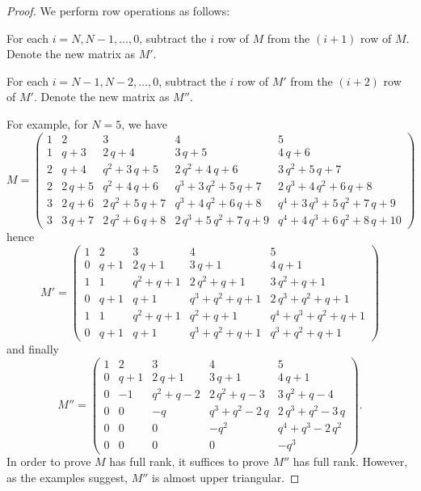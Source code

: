 \begin{proof}
  We perform row operations as follows:
  \begin{itemize}
    \ii For each $i=N,N-1,\dots,0$, subtract the $i$ row of $M$
    from the $(i+1)$ row of $M$.
    Denote the new matrix as $M'$.

    \ii For each $i=N-1,N-2,\dots,0$, subtract the $i$ row of $M'$
    from the $(i+2)$ row of $M'$.
    Denote the new matrix as $M''$.
  \end{itemize}
  For example, for $N = 5$, we have
  \[
    M =
    \begin{pmatrix}
    1 & 2 & 3 & 4 & 5 \\
    1 & q + 3 & 2 \, q + 4 & 3 \, q + 5 & 4 \, q + 6 \\
    2 & q + 4 & q^{2} + 3 \, q + 5 & 2 \, q^{2} + 4 \, q + 6 & 3 \, q^{2} + 5 \, q + 7 \\
    2 & 2 \, q + 5 & q^{2} + 4 \, q + 6 & q^{3} + 3 \, q^{2} + 5 \, q + 7 & 2 \, q^{3} + 4 \, q^{2} + 6 \, q + 8 \\
    3 & 2 \, q + 6 & 2 \, q^{2} + 5 \, q + 7 & q^{3} + 4 \, q^{2} + 6 \, q + 8 & q^{4} + 3 \, q^{3} + 5 \, q^{2} + 7 \, q + 9 \\
    3 & 3 \, q + 7 & 2 \, q^{2} + 6 \, q + 8 & 2 \, q^{3} + 5 \, q^{2} + 7 \, q + 9 & q^{4} + 4 \, q^{3} + 6 \, q^{2} + 8 \, q + 10
    \end{pmatrix}
  \]
  hence
  \[ M'=
    \begin{pmatrix}
    1 & 2 & 3 & 4 & 5 \\
    0 & q + 1 & 2 \, q + 1 & 3 \, q + 1 & 4 \, q + 1 \\
    1 & 1 & q^{2} + q + 1 & 2 \, q^{2} + q + 1 & 3 \, q^{2} + q + 1 \\
    0 & q + 1 & q + 1 & q^{3} + q^{2} + q + 1 & 2 \, q^{3} + q^{2} + q + 1 \\
    1 & 1 & q^{2} + q + 1 & q^{2} + q + 1 & q^{4} + q^{3} + q^{2} + q + 1 \\
    0 & q + 1 & q + 1 & q^{3} + q^{2} + q + 1 & q^{3} + q^{2} + q + 1
    \end{pmatrix}
  \]
  and finally
  \[ M'' =
    \begin{pmatrix}
    1 & 2 & 3 & 4 & 5 \\
    0 & q + 1 & 2 \, q + 1 & 3 \, q + 1 & 4 \, q + 1 \\
    0 & -1 & q^{2} + q - 2 & 2 \, q^{2} + q - 3 & 3 \, q^{2} + q - 4 \\
    0 & 0 & -q & q^{3} + q^{2} - 2 \, q & 2 \, q^{3} + q^{2} - 3 \, q \\
    0 & 0 & 0 & -q^{2} & q^{4} + q^{3} - 2 \, q^{2} \\
    0 & 0 & 0 & 0 & -q^{3}
    \end{pmatrix}.
  \]
  In order to prove $M$ has full rank, it suffices to prove $M''$ has full rank.
  However, as the examples suggest, $M''$ is almost upper triangular.


\end{proof}
